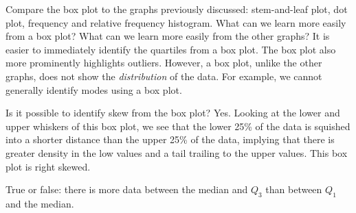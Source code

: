\D{\newpage}

\begin{examplewrap}
\begin{nexample}{Compare the box plot to the graphs previously discussed: stem-and-leaf plot, dot plot, frequency and relative frequency histogram. What can we learn more easily from a box plot? What can we learn more easily from the other graphs?}
It is easier to immediately identify the quartiles from a box plot. The box plot also more prominently highlights outliers. However, a box plot, unlike the other graphs, does not show the \emph{distribution} of the data. For example, we cannot generally identify modes using a box plot.
\end{nexample}
\end{examplewrap}

\begin{examplewrap}
\begin{nexample}
{Is it possible to identify skew from the box plot?} Yes. Looking at the lower and upper whiskers of this box plot, we see that the lower 25\% of the data is squished into a shorter distance than the upper 25\% of the data, implying that there is greater density in the low values and a tail trailing to the upper values. This box plot is right skewed.
\end{nexample}
\end{examplewrap}

\begin{exercisewrap}
\begin{nexercise}
True or false: there is more data between the median and $Q_3$ than between $Q_1$ and the median.\footnotemark
\end{nexercise}
\end{exercisewrap}

